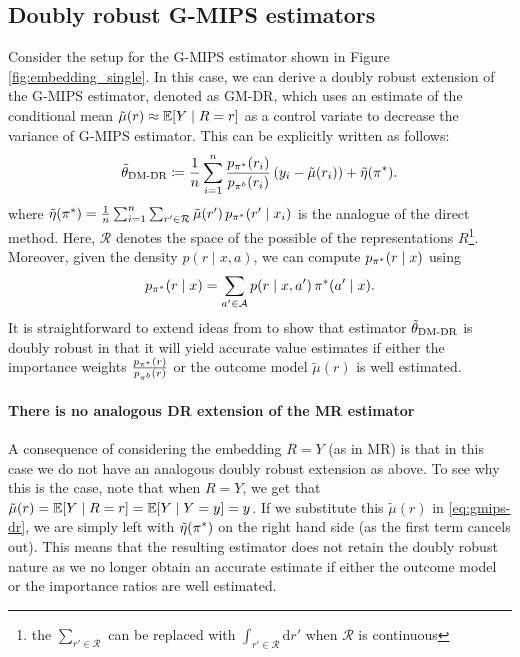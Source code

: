 \subsection{Doubly robust G-MIPS estimators}
Consider the setup for the G-MIPS estimator shown in Figure \ref{fig:embedding_single}. In this case, we can derive a doubly robust extension of the G-MIPS estimator, denoted as GM-DR, which uses an estimate of the conditional mean $\tilde{\mu}(r) \approx \mathbb{E}[Y\mid R=r]$ as a control variate to decrease the variance of G-MIPS estimator. This can be explicitly written as follows:
\begin{align}
\tilde{\theta}_{\textup{DM-DR}} \coloneqq \frac{1}{n} \sum_{i=1}^n \frac{p_{\pi^*}(r_i)}{p_{\pi^b}(r_i)}\,(y_i - \tilde{\mu}(r_i)) + \tilde{\eta}(\pi^*). \label{eq:gmips-dr}    
\end{align}
where $\tilde{\eta}(\pi^*) = \frac{1}{n} \sum_{i=1}^n \sum_{r' \in \mathcal{R}} \tilde{\mu}(r') \, p_{\pi^*}(r' \mid x_i)$ is the analogue of the direct method. Here, $\mathcal{R}$ denotes the space of the possible of the representations $R$\footnote{the $\sum_{r' \in \mathcal{R}}$ can be replaced with $\int_{r' \in \mathcal{R}} \mathrm{d}r'$ when $\mathcal{R}$ is continuous}. Moreover, given the density $p(r \mid x, a)$, we can compute $p_{\pi^*}(r\mid x)$ using
\[
p_{\pi^*}(r\mid x) = \sum_{a' \in \mathcal{A}} p(r \mid x, a')\,\pi^*(a'\mid x).
\]
It is straightforward to extend ideas from \cite{dudik2014doubly} to show that estimator $\tilde{\theta}_{\textup{DM-DR}}$ is doubly robust in that it will yield accurate value estimates if either the importance weights $\frac{p_{\pi^*}(r)}{p_{\pi^b}(r)}$ or the outcome model $\tilde{\mu}(r)$ is well estimated. 

\paragraph{There is no analogous DR extension of the MR estimator}
A consequence of considering the embedding $R=Y$ (as in MR) is that in this case we do not have an analogous doubly robust extension as above. To see why this is the case, note that when $R=Y$, we get that $\tilde{\mu}(r) = \mathbb{E}[Y\mid R=r] = \mathbb{E}[Y\mid Y=y] = y$. If we substitute this $\tilde{\mu}(r)$ in \eqref{eq:gmips-dr}, we are simply left with $\tilde{\eta}(\pi^*)$ on the right hand side (as the first term cancels out). This means that the resulting estimator does not retain the doubly robust nature as we no longer obtain an accurate estimate if either the outcome model or the importance ratios are well estimated.


